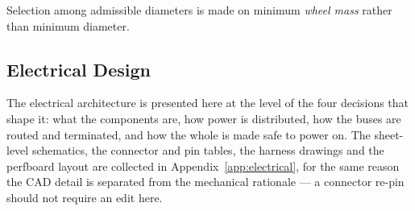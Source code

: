 Selection among admissible diameters is made on minimum \emph{wheel mass}
rather than minimum diameter. 




\subsection{Electrical Design}
\label{sec:electrical}

The electrical architecture is presented here at the level of the four decisions
that shape it: what the components are, how power is distributed, how the buses
are routed and terminated, and how the whole is made safe to power on. The
sheet-level schematics, the connector and pin tables, the harness drawings and
the perfboard layout are collected in Appendix~\ref{app:electrical}, for the
same reason the CAD detail is separated from the mechanical rationale --- a
connector re-pin should not require an edit here.

